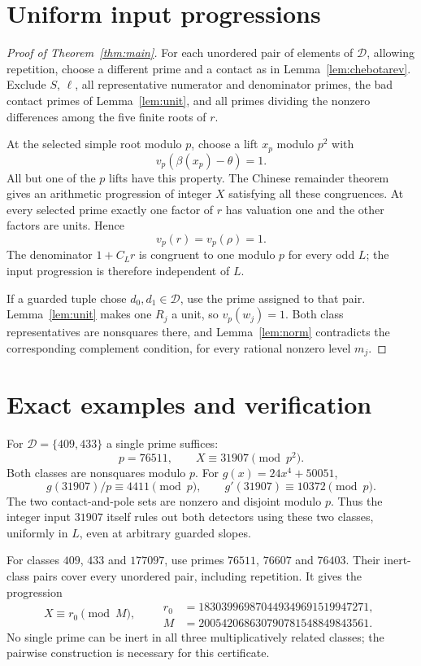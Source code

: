 \documentclass[11pt,a4paper]{article}
\begin{document}
\section{Uniform input progressions}
\begin{proof}[Proof of Theorem~\ref{thm:main}]
For each unordered pair of elements of $\mathcal D$, allowing repetition,
choose a different prime and a contact as in Lemma~\ref{lem:chebotarev}.
Exclude $S$, $\ell$, all representative numerator and denominator
primes, the bad contact primes of Lemma~\ref{lem:unit}, and all primes
dividing the nonzero differences among the five finite roots of $r$.

At the selected simple root modulo $p$, choose a lift $x_p$ modulo
$p^2$ with
\[
                        v_p(\beta(x_p)-\theta)=1.
\]
All but one of the $p$ lifts have this property. The Chinese remainder
theorem gives an arithmetic progression of integer $X$ satisfying all
these congruences. At every selected prime exactly one factor of $r$
has valuation one and the other factors are units. Hence
\[
                            v_p(r)=v_p(\rho)=1.
\]
The denominator $1+C_Lr$ is congruent to one modulo $p$ for every
odd $L$; the input progression is therefore independent of $L$.

If a guarded tuple chose $d_0,d_1\in\mathcal D$, use the prime
assigned to that pair. Lemma~\ref{lem:unit} makes one $R_j$ a unit,
so $v_p(w_j)=1$. Both class representatives are nonsquares there,
and Lemma~\ref{lem:norm} contradicts the corresponding complement
condition, for every rational nonzero level $m_j$.
\end{proof}

\section{Exact examples and verification}
For $\mathcal D=\{409,433\}$ a single prime suffices:
\[
                           p=76511,\qquad X\equiv31907\pmod{p^2}.
\]
Both classes are nonsquares modulo $p$. For $g(x)=24x^4+50051$,
\[
 g(31907)/p\equiv4411\pmod p,\qquad
 g'(31907)\equiv10372\pmod p.
\]
The two contact-and-pole sets are nonzero and disjoint modulo $p$.
Thus the integer input $31907$ itself rules out both detectors using
these two classes, uniformly in $L$, even at arbitrary guarded slopes.

For classes $409$, $433$ and $177097$, use primes
$76511$, $76607$ and $76403$. Their inert-class pairs cover every
unordered pair, including repetition. It gives the progression
\[
 X\equiv r_0\pmod{M},\qquad
 \begin{aligned}
 r_0&=183039969870449349691519947271,\\
 M&=200542068630790781548849843561.
 \end{aligned}
\]
No single prime can be inert in all three multiplicatively related
classes; the pairwise construction is necessary for this certificate.
\end{document}
